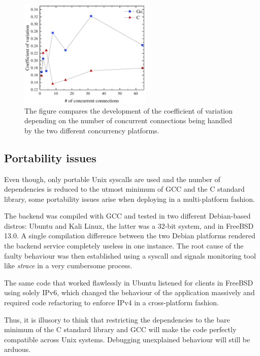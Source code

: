 \begin{figure}[h]
	\centering
	\includegraphics[width=2.5in]{img/cv_new.pdf}
	\caption{The figure compares the development of the coefficient of variation depending on the number of concurrent connections being handled by the two different concurrency platforms.}
	\label{fig_cv}
\end{figure}
\subsection{Portability issues}
Even though, only portable Unix syscalls are used and the number of dependencies is reduced to the utmost minimum of GCC and the C standard library, some portability issues arise when deploying in a multi-platform fashion.

The backend was compiled with GCC and tested in two different Debian-based distros: Ubuntu and Kali Linux, the latter was a 32-bit system, and in FreeBSD 13.0. A single compilation difference between the two Debian platforms rendered the backend service completely useless in one instance. The root cause of the faulty behaviour was then established using a syscall and signals monitoring tool like \textit{strace} in a very cumbersome process. 

The same code that worked flawlessly in Ubuntu listened for clients in FreeBSD using solely IPv6, which changed the behaviour of the application massively and required code refactoring to enforce IPv4 in a cross-platform fashion.

Thus, it is illusory to think that restricting the dependencies to the bare minimum of the C standard library and GCC will make the code perfectly compatible across Unix systems. Debugging unexplained behaviour will still be arduous.